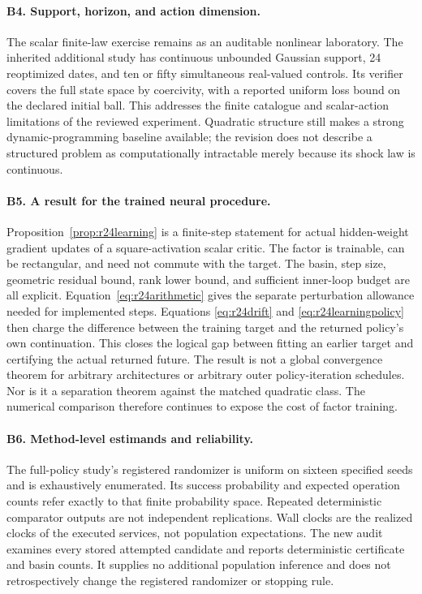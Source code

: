 \paragraph{B4. Support, horizon, and action dimension.}
The scalar finite-law exercise remains as an auditable nonlinear laboratory.
The inherited additional study has continuous unbounded Gaussian support,
24 reoptimized dates, and ten or fifty simultaneous real-valued controls.
Its verifier covers the full state space by coercivity, with a reported
uniform loss bound on the declared initial ball. This addresses the finite
catalogue and scalar-action limitations of the reviewed experiment. Quadratic
structure still makes a strong dynamic-programming baseline available; the
revision does not describe a structured problem as computationally intractable
merely because its shock law is continuous.

\paragraph{B5. A result for the trained neural procedure.}
Proposition~\ref{prop:r24learning} is a finite-step statement for actual
hidden-weight gradient updates of a square-activation scalar critic. The
factor is trainable, can be rectangular, and need not commute with the target.
The basin, step size, geometric residual bound, rank lower bound, and sufficient
inner-loop budget are all explicit. Equation~\eqref{eq:r24arithmetic} gives
the separate perturbation allowance needed for implemented steps. Equations
\eqref{eq:r24drift} and \eqref{eq:r24learningpolicy} then charge the difference
between the training target and the returned policy's own continuation.
This closes the logical gap between fitting an earlier target and certifying
the actual returned future. The result is not a global convergence theorem
for arbitrary architectures or arbitrary outer policy-iteration schedules.
Nor is it a separation theorem against the matched quadratic class. The
numerical comparison therefore continues to expose the cost of factor training.

\paragraph{B6. Method-level estimands and reliability.}
The full-policy study's registered randomizer is uniform on sixteen specified
seeds and is exhaustively enumerated. Its success probability and expected
operation counts refer exactly to that finite probability space. Repeated
deterministic comparator outputs are not independent replications. Wall
clocks are the realized clocks of the executed services, not population
expectations. The new audit examines every stored attempted candidate and
reports deterministic certificate and basin counts. It supplies no additional
population inference and does not retrospectively change the registered
randomizer or stopping rule.

